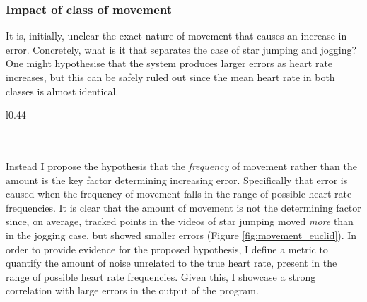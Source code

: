 \subsubsection{Impact of class of movement}
It is, initially, unclear the exact nature of movement that causes an increase in error. Concretely, what is it that separates the case of star jumping and jogging? 
One might hypothesise that the system produces larger errors as heart rate increases, but this can be safely ruled out since the mean heart rate in both classes is almost identical.
\begin{wrapfigure}{l}{0.44\textwidth}
   \centering 
   \scalebox{0.6}{
   }
   \caption{\textit{Mean Euclidean distance moved by tracked points between frames}}
   \label{fig:movement_euclid}
\end{wrapfigure}
\\\\
Instead I propose the hypothesis that the \textit{frequency} of movement rather than the amount is the key factor determining increasing error. Specifically that error is caused when the frequency of movement
falls in the range of possible heart rate frequencies.
It is clear that the amount of movement is not the determining factor since, on average, tracked points in the videos of star jumping moved \textit{more} than in the jogging case, but showed smaller errors (Figure \ref{fig:movement_euclid}).
In order to provide evidence for the proposed hypothesis, I define a metric to quantify the amount of noise unrelated to the true heart rate, present in the range of possible heart rate frequencies.
Given this, I showcase a strong correlation with large errors in the output of the program.



